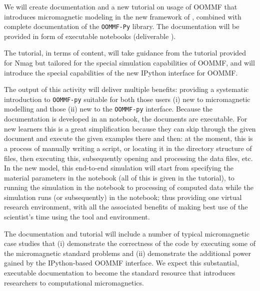 \begin{workpackage}
\begin{tasklist}
\begin{task}[title=\OOMMFNB{} demonstrator: executable tutorial and
  documentation, id=oommf-tutorial-and-documentation]

  We will create documentation and a new tutorial on usage of OOMMF
  that introduces micromagnetic modeling in the new framework of
  \OOMMFNB{}, combined with complete documentation of the
  \texttt{OOMMF-Py} library. The documentation will be provided in
  form of executable \Jupyter notebooks (deliverable ).

  The tutorial, in terms of content, will take guidance from the
  tutorial provided for Nmag \cite{Nmag-tutorial-url} but tailored for the
  special simulation capabilities of OOMMF, and will introduce the
  special capabilities of the new IPython interface for OOMMF.

  The output of this activity will deliver multiple benefits:
  providing a systematic introduction to \texttt{OOMMF-py} suitable for both
  those users (i) new to micromagnetic modelling and those (ii) new to
  the \texttt{OOMMF-py} interface. Because the documentation is developed in an
  \Jupyter notebook, the documents are executable. For new learners
  this is a great simplification because they can skip through the
  given document and execute the given examples there and then: at the
  moment, this is a process of manually writing a script, or locating
  it in the directory structure of files, then executing this,
  subsequently opening and processing the data files, etc. In the new
  model, this end-to-end simulation will start from specifying the
  material parameters in the notebook (all of this is given in the
  tutorial), to running the simulation in the notebook to processing
  of computed data while the simulation runs (or subsequently) in the
  notebook; thus providing one virtual research environment, with all
  the associated benefits of making best use of the scientist's time
  using the tool and environment.

  The documentation and tutorial will include a number of typical
  micromagnetic case studies that (i) demonstrate the correctness of
  the code by executing some of the micromagnetic standard problems
  and (ii) demonstrate the additional power gained by the
  IPython-based OOMMF interface. We expect this substantial, executable
  documentation to become the standard resource that introduces
  researchers to computational micromagnetics.
\end{task}


\end{tasklist}
\end{workpackage}
